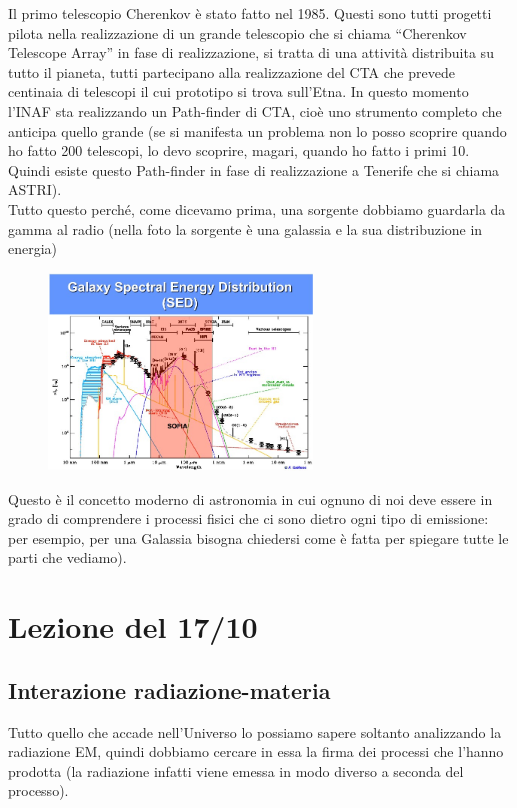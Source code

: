 \documentclass[a4paper,11pt]{article}
\begin{document}
Il primo telescopio Cherenkov è stato fatto nel 1985. Questi sono tutti progetti pilota nella realizzazione di un grande telescopio che si chiama “Cherenkov Telescope Array” in fase di realizzazione, si tratta di una attività distribuita su tutto il pianeta, tutti partecipano alla realizzazione del CTA che prevede centinaia di telescopi il cui prototipo si trova sull’Etna. In questo momento l’INAF sta realizzando un Path-finder di CTA, cioè uno strumento completo che anticipa quello grande (se si manifesta un problema non lo posso scoprire quando ho fatto 200 telescopi, lo devo scoprire, magari, quando ho fatto i primi 10. Quindi esiste questo Path-finder in fase di realizzazione a Tenerife che si chiama ASTRI).\\
Tutto questo perché, come dicevamo prima, una sorgente dobbiamo guardarla da gamma al radio (nella foto la sorgente è una galassia e la sua distribuzione in energia) 

\begin{figure}[h!!]
        \centering
        \includegraphics[width=7cm]{39.jpg}
        \label{}
    \end{figure}

Questo è il concetto moderno di astronomia in cui ognuno di noi deve essere in grado di comprendere i processi fisici che ci sono dietro ogni tipo di emissione: per esempio, per una Galassia bisogna chiedersi come è fatta per spiegare tutte le parti che vediamo).



\newpage
\section{Lezione del 17/10}
\subsection{Interazione radiazione-materia}
Tutto quello che accade nell’Universo lo possiamo sapere soltanto analizzando la radiazione EM, quindi dobbiamo cercare in essa la firma dei processi che l’hanno prodotta (la radiazione infatti viene emessa in modo diverso a seconda del processo).
\end{document}
